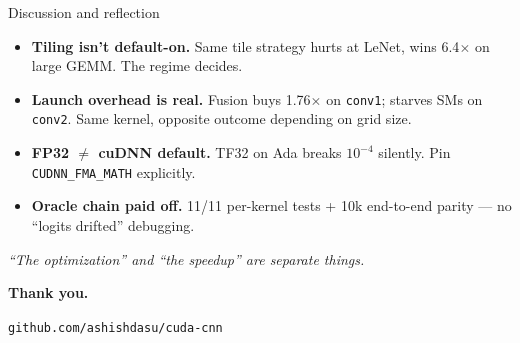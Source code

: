 \documentclass[aspectratio=169,10pt]{beamer}
\begin{document}
\begin{frame}{Discussion and reflection}
  \begin{itemize}\setlength\itemsep{0.45em}
    \item \textbf{Tiling isn't default-on.} Same tile strategy hurts at
          LeNet, wins 6.4$\times$ on large GEMM. The regime decides.
    \item \textbf{Launch overhead is real.} Fusion buys 1.76$\times$ on
          \texttt{conv1}; starves SMs on \texttt{conv2}. Same kernel,
          opposite outcome depending on grid size.
    \item \textbf{FP32 $\neq$ cuDNN default.} TF32 on Ada breaks $10^{-4}$
          silently. Pin \texttt{CUDNN\_FMA\_MATH} explicitly.
    \item \textbf{Oracle chain paid off.} 11/11 per-kernel tests + 10k
          end-to-end parity --- no ``logits drifted'' debugging.
  \end{itemize}

  \vspace{0.5em}
  \begin{center}
  \textit{``The optimization'' and ``the speedup'' are separate things.}
  \end{center}

  \vspace{0.4em}
  \centering\normalsize\textbf{Thank you.}

  \smallskip
  \footnotesize\texttt{github.com/ashishdasu/cuda-cnn}
\end{frame}
\end{document}
